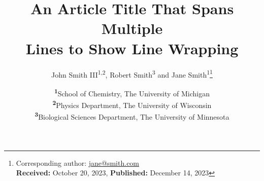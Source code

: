 
\title{An Article Title That Spans Multiple\\ Lines to Show Line Wrapping}

\author{%
  John Smith III\textsuperscript{1,2}, Robert Smith\textsuperscript{3} and Jane
  Smith\textsuperscript{1}\thanks{Corresponding author:
    \href{mailto:jane@smith.com}{jane@smith.com}\\ \textbf{Received:} October 20, 2023,
  \textbf{Published:} December 14, 2023}
}

\date{\footnotesize\textsuperscript{\textbf{1}}School of Chemistry, The University of
  Michigan\\ \textsuperscript{\textbf{2}}Physics Department, The University of
Wisconsin\\ \textsuperscript{\textbf{3}}Biological Sciences Department, The University of Minnesota}
